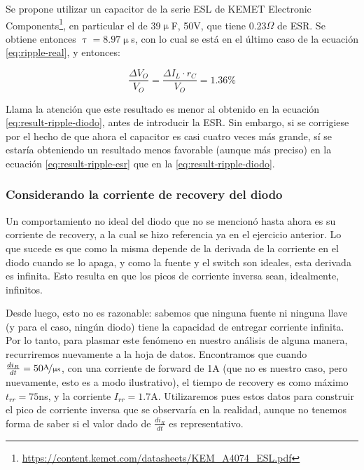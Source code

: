 \documentclass[e4_tp1_main.tex]{subfiles}
\begin{document}
Se propone utilizar un capacitor de la serie ESL de KEMET Electronic Components\footnote{
	\url{https://content.kemet.com/datasheets/KEM_A4074_ESL.pdf}
}, en particular el de 39$\upmu$F, 50V, que tiene 0.23$\Omega$ de ESR. Se obtiene entonces $\uptau = 8.97 \upmu$s, con lo cual se est\'a en el \'ultimo caso de la ecuaci\'on \ref{eq:ripple-real}, y entonces:

\begin{equation}
	\frac{\Delta V_O}{V_O} = \frac{\Delta I_L \cdot r_C}{V_O} = 1.36 \%
	\label{eq:result-ripple-esr}
\end{equation}

Llama la atenci\'on que este resultado es menor al obtenido en la ecuaci\'on \ref{eq:result-ripple-diodo}, antes de introducir la ESR. Sin embargo, si se corrigiese por el hecho de que ahora el capacitor es casi cuatro veces m\'as grande, s\'i se estar\'ia obteniendo un resultado menos favorable (aunque m\'as preciso) en la ecuaci\'on \ref{eq:result-ripple-esr} que en la  \ref{eq:result-ripple-diodo}.


\subsubsection{Considerando la corriente de recovery del diodo}

Un comportamiento no ideal del diodo que no se mencion\'o hasta ahora es su corriente de recovery, a la cual se hizo referencia ya en el ejercicio anterior. Lo que sucede es que como la misma depende de la derivada de la corriente en el diodo cuando se lo apaga, y como la fuente y el switch son ideales, esta derivada es infinita. Esto resulta en que los picos de corriente inversa sean, idealmente, infinitos.

Desde luego, esto no es razonable: sabemos que ninguna fuente ni ninguna llave (y para el caso, ning\'un diodo) tiene la capacidad de entregar corriente infinita. Por lo tanto, para plasmar este fen\'omeno  en nuestro an\'alisis de alguna manera, recurriremos nuevamente a la hoja de datos. Encontramos que cuando $\frac{di_R}{dt} = 50\nicefrac{\text{A}}{\upmu \text{s}}$, con una corriente de forward de 1A (que no es nuestro caso, pero nuevamente, esto es a modo ilustrativo), el tiempo de recovery es como m\'aximo $t_{rr}=75$ns, y la corriente $I_{rr} = 1.7$A. Utilizaremos pues estos datos para construir el pico de corriente inversa que se observar\'ia en la realidad, aunque no tenemos forma de saber si el valor dado de $\frac{di_R}{dt}$ es representativo.
\end{document}
